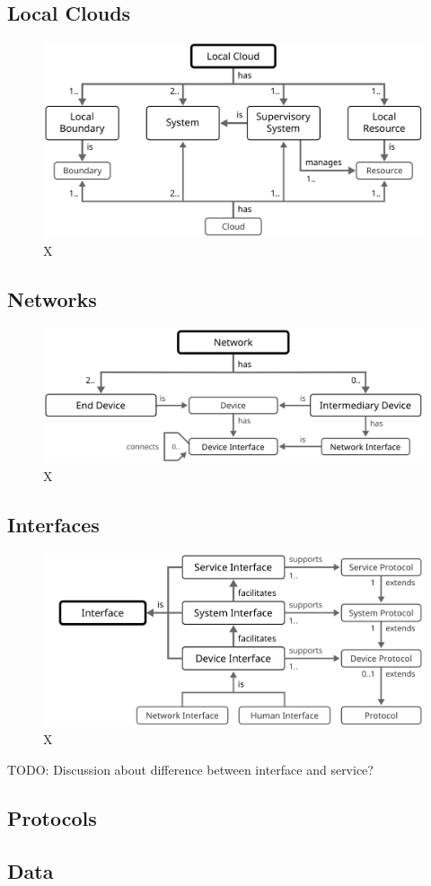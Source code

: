 \subsection{Local Clouds}

\begin{figure}[ht!]
  \centering
  \includegraphics{figures/local-cloud}
  \caption{
    X
  }
  \label{fig:local-cloud}
\end{figure}

\subsection{Networks}

\begin{figure}[ht!]
  \centering
  \includegraphics{figures/network}
  \caption{
    X
  }
  \label{fig:network}
\end{figure}

\subsection{Interfaces}

\begin{figure}[ht!]
  \centering
  \includegraphics{figures/interface}
  \caption{
    X
  }
  \label{fig:interface}
\end{figure}

TODO: Discussion about difference between interface and service?

\subsection{Protocols}

\subsection{Data}
